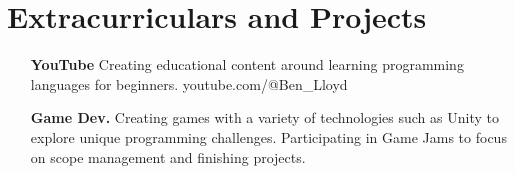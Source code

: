 \documentclass{article}
\begin{document}
\section{Extracurriculars and Projects}
\begin{itemize}
  \item[\bfseries YouTube] Creating educational content around learning programming languages for beginners. youtube.com/@Ben\_Lloyd
  \item[\bfseries Game Dev.] Creating games with a variety of technologies such as Unity to explore unique programming challenges. Participating in Game Jams to focus on scope management and finishing projects.
\end{itemize}

\thispagestyle{empty}
\end{document}
